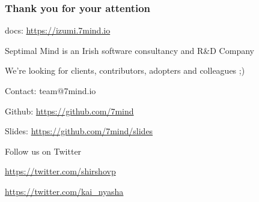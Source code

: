 \documentclass[usenames,dvipsnames,aspectratio=169]{beamer}
\begin{document}
\begin{frame}
    \frametitle{Thank you for your attention}
    \begin{center}
      docs: \url{https://izumi.7mind.io}
    \end{center}
    \begin{center}
      \color{RubineRed}
      Septimal Mind is an Irish software consultancy and R\&D Company

      \vspace{0.3cm}
      We're looking for clients, contributors, adopters and colleagues ;)
    \end{center}
    \begin{center}
      Contact: team@7mind.io

      \vspace{0.3cm}
      Github: \url{https://github.com/7mind}

      \vspace{0.3cm}
      Slides: \url{https://github.com/7mind/slides}
    \end{center}
    \begin{center}
      \color{RoyalBlue}
      Follow us on Twitter

      \vspace{0.3cm}
      \url{https://twitter.com/shirshovp}

      \vspace{0.3cm}
      \url{https://twitter.com/kai_nyasha}
    \end{center}
\end{frame}
\end{document}
